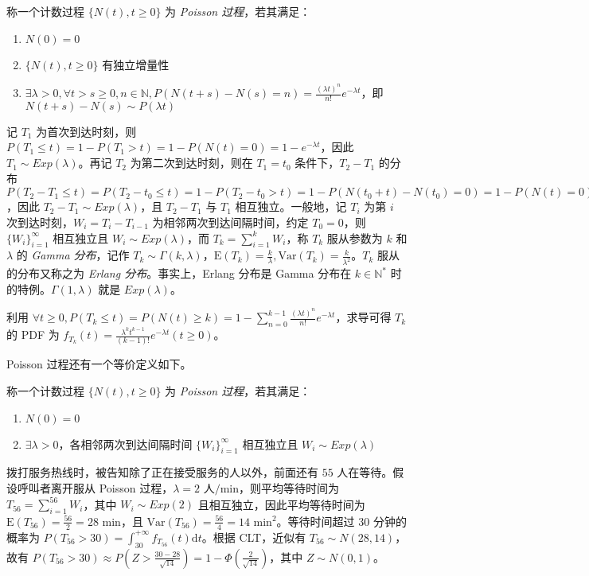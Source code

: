 \documentclass[../main.tex]{subfiles}
\begin{document}
\begin{definition}\label{def:6.3.3}
    称一个计数过程 $\{N(t),t\geq0\}$ 为 \emph{Poisson 过程}，若其满足：
    \begin{enumerate}
        \item $N(0)=0$
        \item $\{N(t),t\geq0\}$ 有独立增量性
        \item $\exists\lambda>0,\forall t>s\geq0,n\in\mathbb N,P(N(t+s)-N(s)=n)=\frac{(\lambda t)^n}{n!}e^{-\lambda t}$，即 $N(t+s)-N(s)\sim P(\lambda t)$
    \end{enumerate}
\end{definition}

记 $T_1$ 为首次到达时刻，则 $P(T_1\leq t)=1-P(T_1>t)=1-P(N(t)=0)=1-e^{-\lambda t}$，因此 $T_1\sim Exp(\lambda)$。再记 $T_2$ 为第二次到达时刻，则在 $T_1=t_0$ 条件下，$T_2-T_1$ 的分布 $P(T_2-T_1\leq t)=P(T_2-t_0\leq t)=1-P(T_2-t_0>t)=1-P(N(t_0+t)-N(t_0)=0)=1-P(N(t)=0)=1-e^{-\lambda t}$，因此 $T_2-T_1\sim Exp(\lambda)$，且 $T_2-T_1$ 与 $T_1$ 相互独立。一般地，记 $T_i$ 为第 $i$ 次到达时刻，$W_i=T_i-T_{i-1}$ 为相邻两次到达间隔时间，约定 $T_0=0$，则 $\{W_i\}_{i=1}^\infty$ 相互独立且 $W_i\sim Exp(\lambda)$，而 $T_k=\sum_{i=1}^kW_i$，称 $T_k$ 服从参数为 $k$ 和 $\lambda$ 的 \emph{Gamma 分布}，记作 $T_k\sim \Gamma(k,\lambda)$，$\mathrm E(T_k)=\frac k\lambda,\mathrm{Var}(T_k)=\frac k{\lambda^2}$。$T_k$ 服从的分布又称之为 \emph{Erlang 分布}。事实上，Erlang 分布是 Gamma 分布在 $k\in\mathbb N^*$ 时的特例。$\Gamma(1,\lambda)$ 就是 $Exp(\lambda)$。

利用 $\forall t\geq0,P(T_k\leq t)=P(N(t)\geq k)=1-\sum_{n=0}^{k-1}\frac{(\lambda t)^n}{n!}e^{-\lambda t}$，求导可得 $T_k$ 的 PDF 为 $f_{T_k}(t)=\frac{\lambda^kt^{k-1}}{(k-1)!}e^{-\lambda t}(t\geq 0)$。

Poisson 过程还有一个等价定义如下。

\begin{definition}\label{def:6.3.4}
    称一个计数过程 $\{N(t),t\geq0\}$ 为 \emph{Poisson 过程}，若其满足：
    \begin{enumerate}
        \item $N(0)=0$
        \item $\exists\lambda>0$，各相邻两次到达间隔时间 $\{W_i\}_{i=1}^\infty$ 相互独立且 $W_i\sim Exp(\lambda)$
    \end{enumerate}
\end{definition}

\begin{example}
    拨打服务热线时，被告知除了正在接受服务的人以外，前面还有 $55$ 人在等待。假设呼叫者离开服从 Poisson 过程，$\lambda=2\text{ 人/min}$，则平均等待时间为 $T_{56}=\sum_{i=1}^{56}W_i$，其中 $W_i\sim Exp(2)$ 且相互独立，因此平均等待时间为 $\mathrm E(T_{56})=\frac{56}{2}=28\text{ min}$，且 $\mathrm{Var}(T_{56})=\frac{56}{4}=14\text{ min}^2$。等待时间超过 $30$ 分钟的概率为 $P(T_{56}>30)=\int_{30}^{+\infty}f_{T_{56}}(t)\mathrm dt$。根据 CLT，近似有 $T_{56}\sim N(28,14)$，故有 $P(T_{56}>30)\approx P(Z>\frac{30-28}{\sqrt{14}})=1-\Phi(\frac2{\sqrt{14}})$，其中 $Z\sim N(0,1)$。
\end{example}
\end{document}
